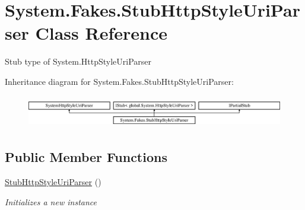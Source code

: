 \hypertarget{class_system_1_1_fakes_1_1_stub_http_style_uri_parser}{\section{System.\-Fakes.\-Stub\-Http\-Style\-Uri\-Parser Class Reference}
\label{class_system_1_1_fakes_1_1_stub_http_style_uri_parser}
}


Stub type of System.\-Http\-Style\-Uri\-Parser 


Inheritance diagram for System.\-Fakes.\-Stub\-Http\-Style\-Uri\-Parser\-:\begin{figure}[H]
\begin{center}
\leavevmode
\includegraphics[height=1.447028cm]{class_system_1_1_fakes_1_1_stub_http_style_uri_parser}
\end{center}
\end{figure}
\subsection*{Public Member Functions}
\begin{DoxyCompactItemize}
\item 
\hyperlink{class_system_1_1_fakes_1_1_stub_http_style_uri_parser_a3a11a9da153e74ff74b7ae5adf4b2262}{Stub\-Http\-Style\-Uri\-Parser} ()
\begin{DoxyCompactList}\small\item\em Initializes a new instance\end{DoxyCompactList}\end{DoxyCompactItemize}
